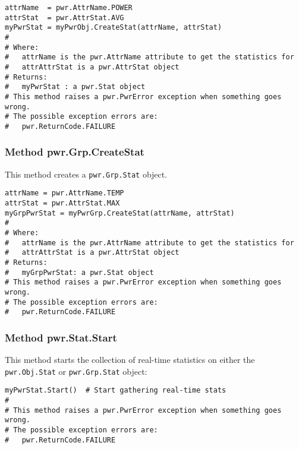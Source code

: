\begin{center}\begin{minipage}{.95\linewidth}\begin{lstlisting}
attrName  = pwr.AttrName.POWER
attrStat  = pwr.AttrStat.AVG
myPwrStat = myPwrObj.CreateStat(attrName, attrStat)
#
# Where:
#   attrName is the pwr.AttrName attribute to get the statistics for
#   attrAttrStat is a pwr.AttrStat object
# Returns:
#   myPwrStat : a pwr.Stat object
# This method raises a pwr.PwrError exception when something goes wrong.
# The possible exception errors are:
#   pwr.ReturnCode.FAILURE
\end{lstlisting}\end{minipage}\end{center}

\subsubsection{Method pwr.Grp.CreateStat } \label{meth:GrpCreateStat}

This method creates a \texttt{pwr.Grp.Stat} object.

\begin{center}\begin{minipage}{.95\linewidth}\begin{lstlisting}
attrName = pwr.AttrName.TEMP
attrStat = pwr.AttrStat.MAX
myGrpPwrStat = myPwrGrp.CreateStat(attrName, attrStat)
#
# Where:
#   attrName is the pwr.AttrName attribute to get the statistics for
#   attrAttrStat is a pwr.AttrStat object
# Returns:
#   myGrpPwrStat: a pwr.Stat object
# This method raises a pwr.PwrError exception when something goes wrong.
# The possible exception errors are:
#   pwr.ReturnCode.FAILURE
\end{lstlisting}\end{minipage}\end{center}

\subsubsection{Method pwr.Stat.Start} \label{meth:StatStart}

This method starts the collection of real-time statistics on either the
\texttt{pwr.Obj.Stat} or \texttt{pwr.Grp.Stat} object:

\begin{center}\begin{minipage}{.95\linewidth}\begin{lstlisting}
myPwrStat.Start()  # Start gathering real-time stats
#
# This method raises a pwr.PwrError exception when something goes wrong.
# The possible exception errors are:
#   pwr.ReturnCode.FAILURE
\end{lstlisting}\end{minipage}\end{center}

